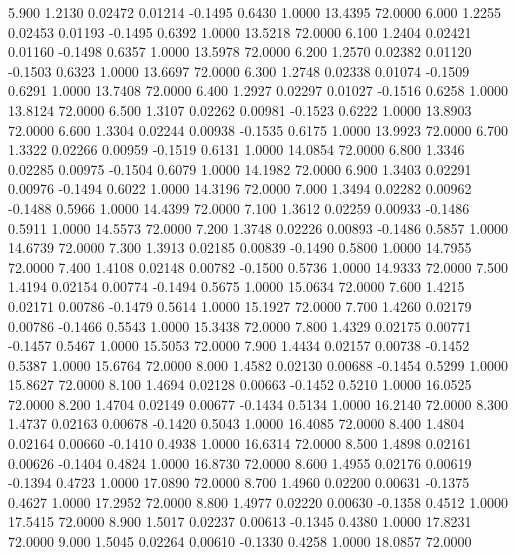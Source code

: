    5.900   1.2130   0.02472   0.01214  -0.1495   0.6430   1.0000  13.4395  72.0000
   6.000   1.2255   0.02453   0.01193  -0.1495   0.6392   1.0000  13.5218  72.0000
   6.100   1.2404   0.02421   0.01160  -0.1498   0.6357   1.0000  13.5978  72.0000
   6.200   1.2570   0.02382   0.01120  -0.1503   0.6323   1.0000  13.6697  72.0000
   6.300   1.2748   0.02338   0.01074  -0.1509   0.6291   1.0000  13.7408  72.0000
   6.400   1.2927   0.02297   0.01027  -0.1516   0.6258   1.0000  13.8124  72.0000
   6.500   1.3107   0.02262   0.00981  -0.1523   0.6222   1.0000  13.8903  72.0000
   6.600   1.3304   0.02244   0.00938  -0.1535   0.6175   1.0000  13.9923  72.0000
   6.700   1.3322   0.02266   0.00959  -0.1519   0.6131   1.0000  14.0854  72.0000
   6.800   1.3346   0.02285   0.00975  -0.1504   0.6079   1.0000  14.1982  72.0000
   6.900   1.3403   0.02291   0.00976  -0.1494   0.6022   1.0000  14.3196  72.0000
   7.000   1.3494   0.02282   0.00962  -0.1488   0.5966   1.0000  14.4399  72.0000
   7.100   1.3612   0.02259   0.00933  -0.1486   0.5911   1.0000  14.5573  72.0000
   7.200   1.3748   0.02226   0.00893  -0.1486   0.5857   1.0000  14.6739  72.0000
   7.300   1.3913   0.02185   0.00839  -0.1490   0.5800   1.0000  14.7955  72.0000
   7.400   1.4108   0.02148   0.00782  -0.1500   0.5736   1.0000  14.9333  72.0000
   7.500   1.4194   0.02154   0.00774  -0.1494   0.5675   1.0000  15.0634  72.0000
   7.600   1.4215   0.02171   0.00786  -0.1479   0.5614   1.0000  15.1927  72.0000
   7.700   1.4260   0.02179   0.00786  -0.1466   0.5543   1.0000  15.3438  72.0000
   7.800   1.4329   0.02175   0.00771  -0.1457   0.5467   1.0000  15.5053  72.0000
   7.900   1.4434   0.02157   0.00738  -0.1452   0.5387   1.0000  15.6764  72.0000
   8.000   1.4582   0.02130   0.00688  -0.1454   0.5299   1.0000  15.8627  72.0000
   8.100   1.4694   0.02128   0.00663  -0.1452   0.5210   1.0000  16.0525  72.0000
   8.200   1.4704   0.02149   0.00677  -0.1434   0.5134   1.0000  16.2140  72.0000
   8.300   1.4737   0.02163   0.00678  -0.1420   0.5043   1.0000  16.4085  72.0000
   8.400   1.4804   0.02164   0.00660  -0.1410   0.4938   1.0000  16.6314  72.0000
   8.500   1.4898   0.02161   0.00626  -0.1404   0.4824   1.0000  16.8730  72.0000
   8.600   1.4955   0.02176   0.00619  -0.1394   0.4723   1.0000  17.0890  72.0000
   8.700   1.4960   0.02200   0.00631  -0.1375   0.4627   1.0000  17.2952  72.0000
   8.800   1.4977   0.02220   0.00630  -0.1358   0.4512   1.0000  17.5415  72.0000
   8.900   1.5017   0.02237   0.00613  -0.1345   0.4380   1.0000  17.8231  72.0000
   9.000   1.5045   0.02264   0.00610  -0.1330   0.4258   1.0000  18.0857  72.0000
